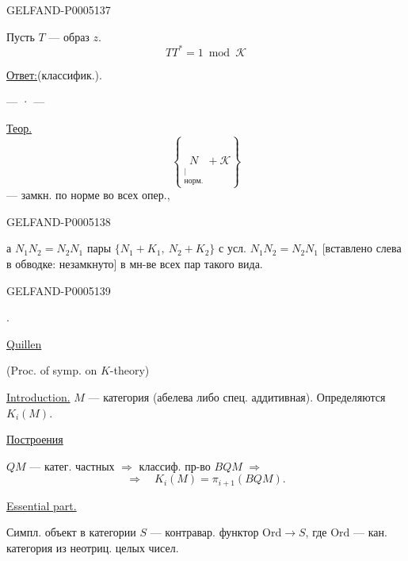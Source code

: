 \begin{GelfandAdjacentEvidence}{GELFAND-P000513}{7}


Пусть $T$ — образ $z$.
\[
TT^*=1\bmod\mathcal K
\]

\uline{Ответ:}\quad{}\quad(классифик.).

\begin{center}— · —\end{center}
\uline{Теор.}
\[
\left\{\underset{\substack{\vert\\\text{норм.}}}{N}+\mathcal K\right\}
\]
— замкн. по норме во всех опер.,
\end{GelfandAdjacentEvidence}
\begin{GelfandAdjacentEvidence}{GELFAND-P000513}{8}


а \sout{\mbox{$N_1N_2=N_2N_1$}}
пары $\{N_1+K_1,\ N_2+K_2\}$ с усл. $N_1N_2=N_2N_1$
[вставлено слева в обводке: незамкнуто] в мн-ве всех пар такого вида.
\end{GelfandAdjacentEvidence}
\begin{GelfandAdjacentEvidence}{GELFAND-P000513}{9}

\end{GelfandAdjacentEvidence}


\quad{}\quad{}.

\qquad\uline{Quillen}\qquad{}

(Proc. of symp. on $K$-theory)

\uline{Introduction.} $M$ — категория (абелева либо спец. аддитивная).
Определяются $K_i(M)$.

\uline{Построения}

$QM$ — катег. частных $\Rightarrow$ классиф. пр-во $BQM$ $\Rightarrow$
\[
\Rightarrow\quad K_i(M)=\pi_{i+1}(BQM).
\]

\uline{Essential part.}

Симпл. объект в категории $S$ — контравар. функтор $\mathrm{Ord}\to S$,
где $\mathrm{Ord}$ — кан. категория из неотриц. целых чисел.


